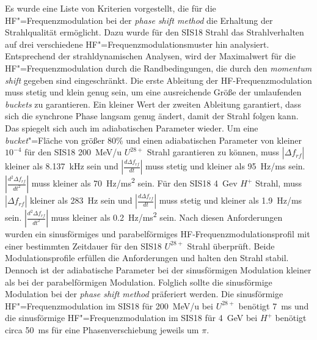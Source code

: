 Es wurde eine Liste von Kriterien vorgestellt, die f\"ur die HF"=Frequenzmodulation bei der \textit{phase shift method} die Erhaltung der Strahlqualit\"at erm\"oglicht. Dazu wurde f\"ur den SIS18 Strahl das Strahlverhalten auf drei verschiedene HF"=Frequenzmodulationsmuster hin analysiert. Entsprechend der strahldynamischen Analysen, wird der Maximalwert f\"ur die HF"=Frequenzmodulation durch die Randbedingungen, die durch den \textit{momentum shift} gegeben sind eingeschr\"ankt. Die erste Ableitung der HF-Frequenzmodulation muss stetig und klein genug sein, um eine ausreichende Gr\"oße der umlaufenden \textit{buckets}  zu garantieren. Ein kleiner Wert der zweiten Ableitung garantiert,  dass sich die synchrone Phase langsam genug ändert, damit der Strahl folgen kann. Das spiegelt sich auch im adiabatischen Parameter wieder. Um eine \textit{bucket}"=Fl\"ache von größer 80$\%$  und einen adiabatischen Parameter von kleiner $10^{-4}$ f\"ur den SIS18 \SI{200}{MeV/u} $U^\mathit{28+}$ Strahl garantieren zu k\"onnen, muss $|\Delta f_{\mathit{rf}}|$ kleiner als \SI{8.137}{kHz} sein und $|\frac{d\Delta f_{\mathit{rf}}}{dt}|$ muss stetig und kleiner als \SI{95}{Hz/ms} sein. $|\frac{d^2\Delta f_{\mathit{rf}}}{dt^2}|$ muss kleiner als \SI{70}{Hz/ms^2} sein. Für den SIS18 \SI{4}{Gev} $H^{+}$ Strahl, muss $|\Delta f_{\mathit{rf}}|$ kleiner als \SI{283}{Hz} sein und $|\frac{d\Delta f_{\mathit{rf}}}{dt}|$ muss stetig und kleiner als \SI{1.9}{Hz/ms} sein. $|\frac{d^2\Delta f_{\mathit{rf}}}{dt^2}|$ muss kleiner als \SI{0.2}{Hz/ms^2} sein. Nach diesen Anforderungen wurden ein sinusförmiges und parabelförmiges HF-Frequenzmodulationsprofil mit einer bestimmten Zeitdauer f\"ur den SIS18 $U^{28+}$ Strahl \"uberpr\"uft. Beide Modulationsprofile erfüllen die Anforderungen und halten den Strahl stabil. Dennoch ist der adiabatische Parameter bei der sinusf\"ormigen Modulation kleiner als bei der parabelförmigen Modulation. Folglich sollte die sinusförmige Modulation bei der \textit{phase shift method} pr\"aferiert werden. Die sinusf\"ormige HF"=Frequenzmodulation im SIS18 f\"ur
\SI{200}{MeV/u} bei $U^\mathit{28+}$ ben\"otigt \SI{7}{\ms} und die sinusf\"ormige HF"=Frequenzmodulation im SIS18 f\"ur \SI{4}{GeV} bei $H^+$ ben\"otigt circa \SI{50}{\ms} f\"ur eine Phasenverschiebung jeweils um $\pi$.   

